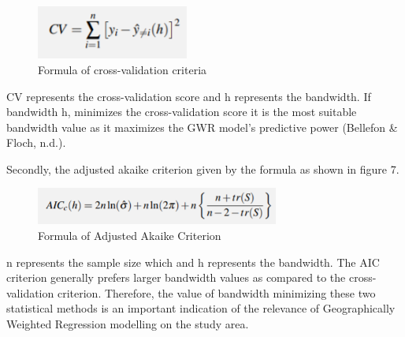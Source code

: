 \documentclass{acm_proc_article-sp}
\begin{document}
\begin{figure}[h]
\centering
\includegraphics[width=5cm]{cv.png}
\caption{Formula of cross-validation criteria}\label{fig6}
\end{figure}

CV represents the cross-validation score and h represents the bandwidth.
If bandwidth h, minimizes the cross-validation score it is the most
suitable bandwidth value as it maximizes the GWR model's predictive
power (Bellefon \& Floch, n.d.).

Secondly, the adjusted akaike criterion given by the formula as shown in
figure 7.\\

\begin{figure}[h]
\centering
\includegraphics[width=8cm]{aac.png}
\caption{Formula of Adjusted Akaike Criterion}\label{fig7}
\end{figure}

n represents the sample size which and h represents the bandwidth. The
AIC criterion generally prefers larger bandwidth values as compared to
the cross-validation criterion. Therefore, the value of bandwidth
minimizing these two statistical methods is an important indication of
the relevance of Geographically Weighted Regression modelling on the
study area.
\setlength{\parindent}{0in}
\end{document}
